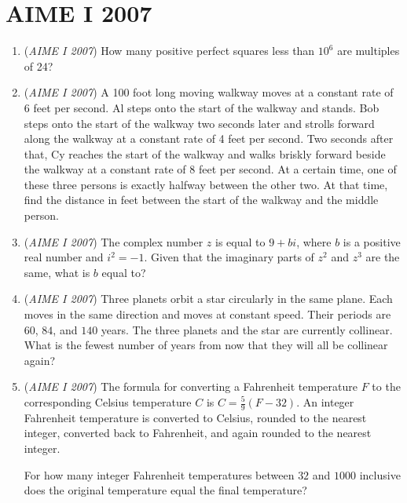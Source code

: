\section{AIME I 2007}
        \begin{enumerate}
        	\item (\textit{AIME I 2007}) How many positive perfect squares less than $10^6$ are multiples of 24?


 

	\item (\textit{AIME I 2007}) A 100 foot long moving walkway moves at a constant rate of 6 feet per second.  Al steps onto the start of the walkway and stands.  Bob steps onto the start of the walkway two seconds later and strolls forward along the walkway at a constant rate of 4 feet per second.  Two seconds after that, Cy reaches the start of the walkway and walks briskly forward beside the walkway at a constant rate of 8 feet per second.  At a certain time, one of these three persons is exactly halfway between the other two.  At that time, find the distance in feet between the start of the walkway and the middle person.


 

	\item (\textit{AIME I 2007}) The complex number $z$ is equal to $9+bi$, where $b$ is a positive real number and $i^{2}=-1$.  Given that the imaginary parts of $z^{2}$ and $z^{3}$ are the same, what is $b$ equal to?


 

	\item (\textit{AIME I 2007}) Three planets orbit a star circularly in the same plane.  Each moves in the same direction and moves at constant speed.  Their periods are $60$, $84$, and $140$ years.  The three planets and the star are currently collinear.  What is the fewest number of years from now that they will all be collinear again?


 

	\item (\textit{AIME I 2007}) The formula for converting a Fahrenheit temperature $F$ to the corresponding Celsius temperature $C$ is $C = \frac{5}{9}(F-32).$  An integer Fahrenheit temperature is converted to Celsius, rounded to the nearest integer, converted back to Fahrenheit, and again rounded to the nearest integer.


 For how many integer Fahrenheit temperatures between $32$ and $1000$ inclusive does the original temperature equal the final temperature?



\end{enumerate}
